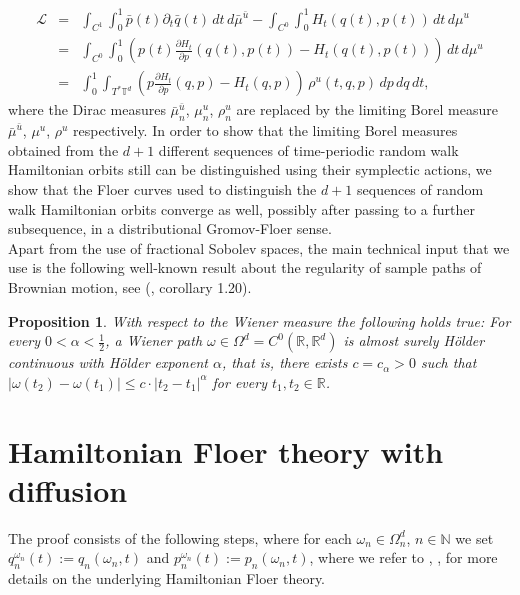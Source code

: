 \documentclass[a4paper,11pt]{amsart}
\newcommand{\NN}{\mathbb{N}}
\newcommand{\RR}{\mathbb{R}}
\newcommand{\TT}{\mathbb{T}}
\newtheorem{proposition}[theorem]{Proposition}
\begin{document}
\begin{eqnarray*}
\mathcal{L}&=&\int_{C^1}\int_0^1\bar{p}(t)\partial_t\bar{q}(t)\,dt\,d\bar{\mu}^{\bar{u}}-\int_{C^0}\int_0^1 H_t(q(t),p(t))\,dt\,d\mu^u\\
&=&\int_{C^0}\int_0^1 \left(p(t)\frac{\partial H_t}{\partial p}(q(t),p(t))- H_t(q(t),p(t))\right)\,dt\,d\mu^u\\
&=&\int_0^1\int_{T^*\TT^d} \left(p\frac{\partial H_t}{\partial p}(q,p)- H_t(q,p)\right)\,\rho^u(t,q,p) \,dp\,dq \,dt,
\end{eqnarray*}
where the Dirac measures $\bar{\mu}^{\bar{u}}_n$, $\mu^u_n$, $\rho^u_n$ are replaced by the limiting Borel measure $\bar{\mu}^{\bar{u}}$, $\mu^u$, $\rho^u$ respectively. In order to show that the limiting Borel measures obtained from the $d+1$ different sequences of time-periodic random walk Hamiltonian orbits still can be distinguished using their symplectic actions, we show that the Floer curves used to distinguish the $d+1$ sequences of random walk Hamiltonian orbits converge as well, possibly after passing to a further subsequence, in a distributional Gromov-Floer sense.\\
\indent Apart from the use of fractional Sobolev spaces, the main technical input that we use is the following well-known result about the regularity of sample paths of Brownian motion, see (\cite{MY}, corollary 1.20).
\begin{proposition}\label{regularity}
With respect to the Wiener measure the following holds true: For every $0<\alpha<\frac{1}{2}$, a Wiener path $\omega\in\Omega^d=C^0(\RR,\RR^d)$ is almost surely H\"older continuous with H\"older exponent $\alpha$, that is, there exists $c=c_{\alpha}>0$ such that $|\omega(t_2)-\omega(t_1)|\leq c\cdot |t_2-t_1|^{\alpha}$ for every $t_1,t_2\in\RR$.
\end{proposition}

\section{Hamiltonian Floer theory with diffusion}
The proof consists of the following steps, where for each $\omega_n\in\Omega_n^d$, $n\in\NN$ we set $q_n^{\omega_n}(t):=q_n(\omega_n,t)$ and $p_n^{\omega_n}(t):=p_n(\omega_n,t)$, where we refer to \cite{AD}, \cite{AH}, \cite{Sch} for more details on the underlying Hamiltonian Floer theory. \\
\end{document}

